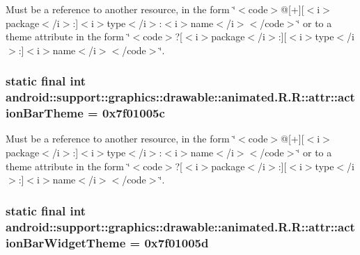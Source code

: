 Must be a reference to another resource, in the form \char`\"{}$<$code$>$@\mbox{[}+\mbox{]}\mbox{[}$<$i$>$package$<$/i$>$:\mbox{]}$<$i$>$type$<$/i$>$:$<$i$>$name$<$/i$>$$<$/code$>$\char`\"{} or to a theme attribute in the form \char`\"{}$<$code$>$?\mbox{[}$<$i$>$package$<$/i$>$:\mbox{]}\mbox{[}$<$i$>$type$<$/i$>$:\mbox{]}$<$i$>$name$<$/i$>$$<$/code$>$\char`\"{}. \hypertarget{classandroid_1_1support_1_1graphics_1_1drawable_1_1animated_1_1_r_1_1attr_ede30ab3af03eaa39f82d31e90089279}{
\subsubsection[{actionBarTheme}]{\setlength{\rightskip}{0pt plus 5cm}static final int android::support::graphics::drawable::animated.R.R::attr::actionBarTheme = 0x7f01005c}}
\label{classandroid_1_1support_1_1graphics_1_1drawable_1_1animated_1_1_r_1_1attr_ede30ab3af03eaa39f82d31e90089279}


Must be a reference to another resource, in the form \char`\"{}$<$code$>$@\mbox{[}+\mbox{]}\mbox{[}$<$i$>$package$<$/i$>$:\mbox{]}$<$i$>$type$<$/i$>$:$<$i$>$name$<$/i$>$$<$/code$>$\char`\"{} or to a theme attribute in the form \char`\"{}$<$code$>$?\mbox{[}$<$i$>$package$<$/i$>$:\mbox{]}\mbox{[}$<$i$>$type$<$/i$>$:\mbox{]}$<$i$>$name$<$/i$>$$<$/code$>$\char`\"{}. \hypertarget{classandroid_1_1support_1_1graphics_1_1drawable_1_1animated_1_1_r_1_1attr_148669f6b45b8d19a8c573d436e7a10e}{
\subsubsection[{actionBarWidgetTheme}]{\setlength{\rightskip}{0pt plus 5cm}static final int android::support::graphics::drawable::animated.R.R::attr::actionBarWidgetTheme = 0x7f01005d}}
\label{classandroid_1_1support_1_1graphics_1_1drawable_1_1animated_1_1_r_1_1attr_148669f6b45b8d19a8c573d436e7a10e}


